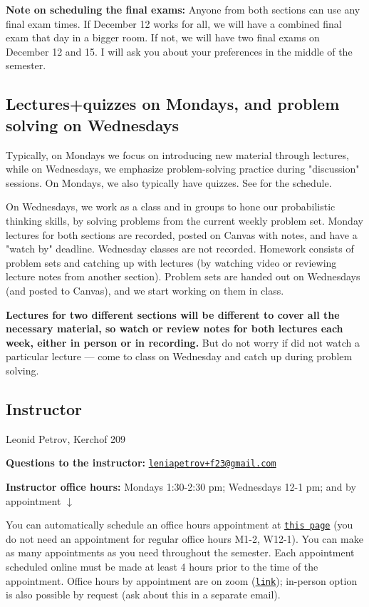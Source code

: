 \documentclass[oneside,11pt]{amsart}
\begin{document}
\medskip

\textbf{Note on scheduling the final exams:} Anyone from both sections can use any final exam times. If December 12 works for all, we will have a combined final exam that day in a bigger room. If not, we will have two final exams on December 12 and 15. I will ask you about your preferences in the middle of the semester.


\subsection{Lectures+quizzes on Mondays, and problem solving on Wednesdays}
Typically, on Mondays we focus on introducing new material through lectures, while on Wednesdays, we emphasize problem-solving practice during "discussion" sessions. On Mondays, we also typically have quizzes. See  for the schedule.

On Wednesdays, we work as a class and in groups to hone our probabilistic thinking skills, by solving problems from the current weekly problem set. Monday lectures for both sections are recorded, posted on Canvas with notes, and have a "watch by" deadline. Wednesday classes are not recorded. Homework consists of problem sets and catching up with lectures (by watching video or reviewing lecture notes from another section). Problem sets are handed out on Wednesdays (and posted to Canvas), and we start working on them in class.

\textbf{Lectures for two different sections will be different to cover all the necessary material, so watch or review notes for both lectures each week, either in person or in recording.} But do not worry if did not watch a particular lecture --- come to class on Wednesday and catch up during problem solving.



\subsection{Instructor}

Leonid Petrov, Kerchof 209

\textbf{Questions to the instructor:} \href{mailto:leniapetrov+f23@gmail.com}{\texttt{leniapetrov+f23@gmail.com}}

\textbf{Instructor office hours:} 
Mondays 1:30-2:30 pm; Wednesdays 12-1 pm; and by appointment $\downarrow$

You can automatically schedule an office hours appointment 
at \href{https://lpetrov.cc/teaching/}{\texttt{this page}} (you do not need an appointment for 
regular office hours M1-2, W12-1).
You can make as many appointments as you need throughout the semester.
Each appointment scheduled online
must be made at least 4 hours prior to the time of the appointment.
Office hours by appointment are on zoom (\href{https://virginia.zoom.us/j/97731277583?pwd=UFNvZ0NHNWRRaHpPTGYrTnJiZ3Rpdz09}{\texttt{link}}); 
in-person option is also possible by request (ask about this in a separate email).
\end{document}
